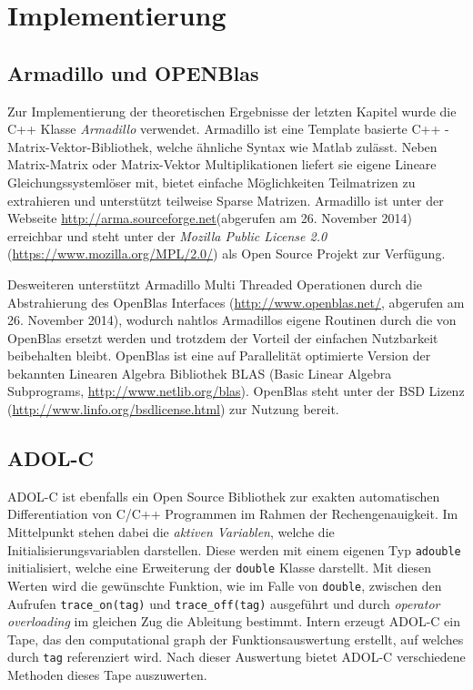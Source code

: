 \chapter{Implementierung}
\section{Armadillo und OPENBlas}
Zur Implementierung der theoretischen Ergebnisse der letzten Kapitel wurde die C++ Klasse \textit{Armadillo} verwendet. 
Armadillo ist eine Template basierte C++ -Matrix-Vektor-Bibliothek, welche ähnliche Syntax wie Matlab zulässt. Neben Matrix-Matrix oder Matrix-Vektor Multiplikationen liefert sie eigene Lineare Gleichungssystemlöser mit, bietet einfache Möglichkeiten Teilmatrizen zu extrahieren und unterstützt teilweise Sparse Matrizen. Armadillo ist unter der Webseite \url{http://arma.sourceforge.net}(abgerufen am 26. November 2014) erreichbar und steht unter der \textit{Mozilla Public License 2.0} (\url{https://www.mozilla.org/MPL/2.0/}) als Open Source Projekt zur Verfügung.

Desweiteren unterstützt Armadillo Multi Threaded Operationen durch die Abstrahierung des OpenBlas Interfaces (\url{http://www.openblas.net/}, abgerufen am 26. November 2014), wodurch nahtlos Armadillos eigene Routinen durch die von OpenBlas ersetzt werden und trotzdem der Vorteil der einfachen Nutzbarkeit beibehalten bleibt. OpenBlas ist eine auf Parallelität optimierte Version der bekannten Linearen Algebra Bibliothek BLAS (Basic Linear Algebra Subprograms, \url{http://www.netlib.org/blas}). OpenBlas steht unter der BSD Lizenz (\url{http://www.linfo.org/bsdlicense.html}) zur Nutzung bereit.

\section{ADOL-C}
ADOL-C ist ebenfalls ein Open Source Bibliothek zur exakten automatischen Differentiation von C/C++ Programmen im Rahmen der Rechengenauigkeit. Im Mittelpunkt stehen dabei die \textit{aktiven Variablen}, welche die Initialisierungsvariablen darstellen. Diese werden mit einem eigenen Typ \texttt{adouble} initialisiert, welche eine Erweiterung der \texttt{double} Klasse darstellt. Mit diesen Werten wird die gewünschte Funktion, wie im Falle von \texttt{double}, zwischen den Aufrufen \texttt{trace\_on(tag)} und \texttt{trace\_off(tag)} ausgeführt und durch \textit{operator overloading} im gleichen Zug die Ableitung bestimmt. Intern erzeugt ADOL-C ein Tape, das den computational graph der Funktionsauswertung erstellt, auf welches durch \texttt{tag} referenziert wird. Nach dieser Auswertung bietet ADOL-C verschiedene Methoden dieses Tape auszuwerten.

